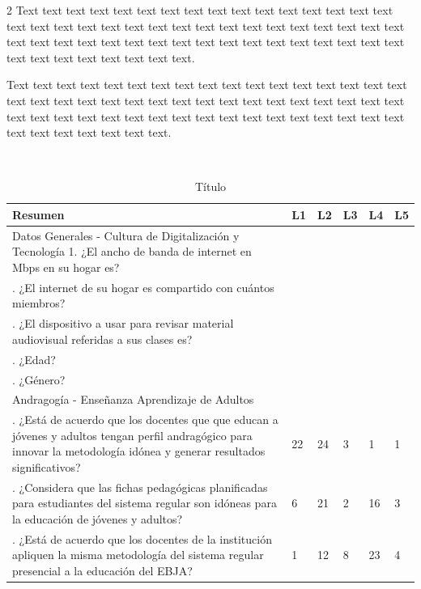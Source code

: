 \documentclass[12pt,twoside]{apa7}
\begin{document}
\begin{multicols}{2}
Text text text text text text text text text text text text text text text text text text text text text text text text text text text text text text text text text text text text text text text text text text text text text text text text text text text text text text text text text text.

Text text text text text text text text text text text text text text text text text text text text text text text text text text text text text text text text text text text text text text text text text text text text text text text text text text text text text text text text text text.


\begin{table}[ht!]
\setlength\tabcolsep{3pt}
\caption{Título}
\label{tab1}
\hfill{} \\
\begin{tabularx}{\linewidth}{@{}>{\RaggedRight}X*{5}{l}@{}} 
\textbf{Resumen} & \textbf{L1} & \textbf{L2} & \textbf{L3} & \textbf{L4} & \textbf{L5} \\
\toprule
Datos Generales - Cultura de Digitalización y Tecnología
1. ¿El ancho de banda de internet en Mbps en su hogar es?  &  &  &  &  &  \\
2. ¿El internet de su hogar es compartido con cuántos miembros? &  &  &  &  &  \\
3. ¿El dispositivo a usar para revisar material audiovisual referidas a sus clases es? &  &  &  &  &  \\
4. ¿Edad? &  &  &  &  &  \\
5. ¿Género? &  &  &  &  &  \\
\midrule
Andragogía - Enseñanza Aprendizaje de Adultos\\
\midrule
6. ¿Está de acuerdo que los docentes que que educan a jóvenes y adultos tengan perfil andragógico para innovar la metodología idónea y generar resultados significativos? & 22 & 24 & 3 & 1 & 1 \\
7. ¿Considera que las fichas pedagógicas planificadas para estudiantes del sistema regular son idóneas para la educación de jóvenes y adultos? & 6 & 21 & 2 & 16 & 3 \\
8. ¿Está de acuerdo que los docentes de la institución apliquen la misma metodología del sistema regular presencial a la educación del EBJA? & 1 & 12 & 8 & 23 & 4 \\
\bottomrule
\end{tabularx}
\end{table}


\end{multicols}
\end{document}
